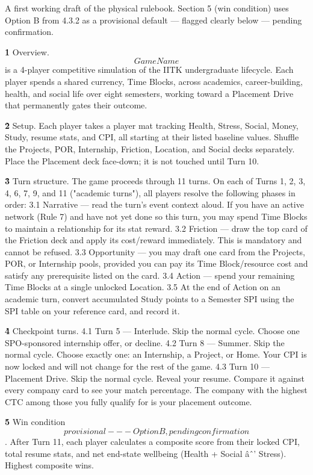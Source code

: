 A first working draft of the physical rulebook. Section 5 (win condition) uses Option B from 4.3.2 as a provisional default --- flagged clearly below --- pending confirmation.

\textbf{1\.} Overview. \[Game Name\] is a 4-player competitive simulation of the IITK undergraduate lifecycle. Each player spends a shared currency, Time Blocks, across academics, career-building, health, and social life over eight semesters, working toward a Placement Drive that permanently gates their outcome.

\textbf{2\.} Setup. Each player takes a player mat tracking Health, Stress, Social, Money, Study, resume stats, and CPI, all starting at their listed baseline values. Shuffle the Projects, POR, Internship, Friction, Location, and Social decks separately. Place the Placement deck face-down; it is not touched until Turn 10.

\textbf{3\.} Turn structure. The game proceeds through 11 turns. On each of Turns 1, 2, 3, 4, 6, 7, 9, and 11 ("academic turns"), all players resolve the following phases in order: 3.1 Narrative --- read the turn's event context aloud. If you have an active network (Rule 7) and have not yet done so this turn, you may spend Time Blocks to maintain a relationship for its stat reward. 3.2 Friction --- draw the top card of the Friction deck and apply its cost/reward immediately. This is mandatory and cannot be refused. 3.3 Opportunity --- you may draft one card from the Projects, POR, or Internship pools, provided you can pay its Time Block/resource cost and satisfy any prerequisite listed on the card. 3.4 Action --- spend your remaining Time Blocks at a single unlocked Location. 3.5 At the end of Action on an academic turn, convert accumulated Study points to a Semester SPI using the SPI table on your reference card, and record it.

\textbf{4\.} Checkpoint turns. 4.1 Turn 5 --- Interlude. Skip the normal cycle. Choose one SPO-sponsored internship offer, or decline. 4.2 Turn 8 --- Summer. Skip the normal cycle. Choose exactly one: an Internship, a Project, or Home. Your CPI is now locked and will not change for the rest of the game. 4.3 Turn 10 --- Placement Drive. Skip the normal cycle. Reveal your resume. Compare it against every company card to see your match percentage. The company with the highest CTC among those you fully qualify for is your placement outcome.

\textbf{5\.} Win condition \[provisional --- Option B, pending confirmation\]. After Turn 11, each player calculates a composite score from their locked CPI, total resume stats, and net end-state wellbeing (Health + Social âˆ' Stress). Highest composite wins.

